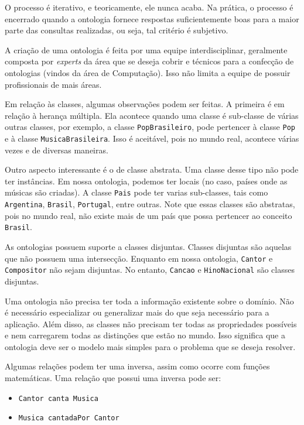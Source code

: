 O processo é iterativo, e teoricamente, ele nunca acaba. Na prática, o processo é encerrado quando a ontologia fornece respostas suficientemente boas para a maior parte das consultas realizadas, ou seja, tal critério é subjetivo.

A criação de uma ontologia é feita por uma equipe interdisciplinar, geralmente composta por \textit{experts} da área que se deseja cobrir e técnicos para a confecção de ontologias (vindos da área de Computação). Isso não limita a equipe de possuir profissionais de mais áreas.

Em relação às classes, algumas observações podem ser feitas. A primeira é em relação à herança múltipla. Ela acontece quando uma classe é sub-classe de várias outras classes, por exemplo, a classe \texttt{PopBrasileiro}, pode pertencer à classe \texttt{Pop} e à classe \texttt{MusicaBrasileira}. Isso é aceitável, pois no mundo real, acontece várias vezes e de diversas maneiras.

Outro aspecto interessante é o de classe abstrata. Uma classe desse tipo não pode ter instâncias. Em nossa ontologia, podemos ter locais (no caso, países onde as músicas são criadas). A classe \texttt{Pais} pode ter varias sub-classes, tais como \texttt{Argentina}, \texttt{Brasil}, \texttt{Portugal}, entre outras. Note que essas classes são abstratas, pois no mundo real, não existe mais de um país que possa pertencer ao conceito \texttt{Brasil}.

As ontologias possuem suporte a classes disjuntas. Classes disjuntas são aquelas que não possuem uma intersecção. Enquanto em nossa ontologia, \texttt{Cantor} e \texttt{Compositor} não sejam disjuntas. No entanto, \texttt{Cancao} e \texttt{HinoNacional} são classes disjuntas.

Uma ontologia não precisa ter toda a informação existente sobre o domínio. Não é necessário especializar ou generalizar mais do que seja necessário para a aplicação. Além disso, as classes não precisam ter todas as propriedades possíveis e nem carregarem todas as distinções que estão no mundo. Isso significa que a ontologia deve ser o modelo mais simples para o problema que se deseja resolver.

Algumas relações podem ter uma inversa, assim como ocorre com funções matemáticas. Uma relação que possui uma inversa pode ser:

\begin{itemize}
	\item \texttt{Cantor canta Musica}
	\item \texttt{Musica cantadaPor Cantor}
\end{itemize}

